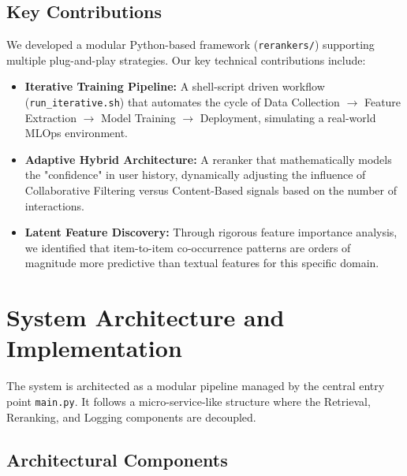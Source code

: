 \documentclass[11pt,a4paper]{article}
\begin{document}
\subsection{Key Contributions}
We developed a modular Python-based framework (\texttt{rerankers/}) supporting multiple plug-and-play strategies. Our key technical contributions include:
\begin{itemize}
    \item \textbf{Iterative Training Pipeline:} A shell-script driven workflow (\texttt{run\_iterative.sh}) that automates the cycle of Data Collection $\rightarrow$ Feature Extraction $\rightarrow$ Model Training $\rightarrow$ Deployment, simulating a real-world MLOps environment.
    \item \textbf{Adaptive Hybrid Architecture:} A reranker that mathematically models the "confidence" in user history, dynamically adjusting the influence of Collaborative Filtering versus Content-Based signals based on the number of interactions.
    \item \textbf{Latent Feature Discovery:} Through rigorous feature importance analysis, we identified that item-to-item co-occurrence patterns are orders of magnitude more predictive than textual features for this specific domain.
\end{itemize}

\section{System Architecture and Implementation}

The system is architected as a modular pipeline managed by the central entry point \texttt{main.py}. It follows a micro-service-like structure where the Retrieval, Reranking, and Logging components are decoupled.

\subsection{Architectural Components}
\end{document}
